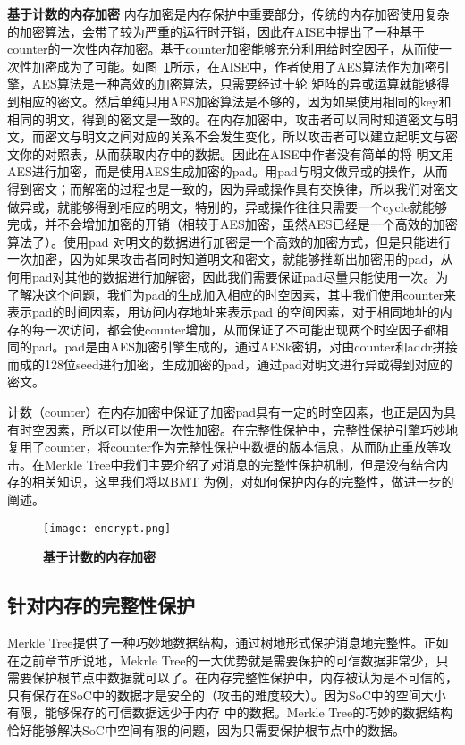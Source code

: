 \textbf{基于计数的内存加密}
内存加密是内存保护中重要部分，传统的内存加密使用复杂的加密算法，会带了较为严重的运行时开销，因此在AISE中提出了一种基于counter的一次性内存加密。基于counter加密能够充分利用给时空因子，从而使一次性加密成为了可能。如图~\ref{fig:encrypt.png}所示，在AISE中，作者使用了AES算法作为加密引擎，AES算法是一种高效的加密算法，只需要经过十轮
矩阵的异或运算就能够得到相应的密文。然后单纯只用AES加密算法是不够的，因为如果使用相同的key和相同的明文，得到的密文是一致的。在内存加密中，攻击者可以同时知道密文与明文，而密文与明文之间对应的关系不会发生变化，所以攻击者可以建立起明文与密文你的对照表，从而获取内存中的数据。因此在AISE中作者没有简单的将
明文用AES进行加密，而是使用AES生成加密的pad。用pad与明文做异或的操作，从而得到密文；而解密的过程也是一致的，因为异或操作具有交换律，所以我们对密文做异或，就能够得到相应的明文，特别的，异或操作往往只需要一个cycle就能够完成，并不会增加加密的开销（相较于AES加密，虽然AES已经是一个高效的加密算法了）。使用pad
对明文的数据进行加密是一个高效的加密方式，但是只能进行一次加密，因为如果攻击者同时知道明文和密文，就能够推断出加密用的pad，从何用pad对其他的数据进行加解密，因此我们需要保证pad尽量只能使用一次。为了解决这个问题，我们为pad的生成加入相应的时空因素，其中我们使用counter来表示pad的时间因素，用访问内存地址来表示pad
的空间因素，对于相同地址的内存的每一次访问，都会使counter增加，从而保证了不可能出现两个时空因子都相同的pad。pad是由AES加密引擎生成的，通过AESk密钥，对由counter和addr拼接而成的128位seed进行加密，生成加密的pad，通过pad对明文进行异或得到对应的密文。

计数（counter）在内存加密中保证了加密pad具有一定的时空因素，也正是因为具有时空因素，所以可以使用一次性加密。在完整性保护中，完整性保护引擎巧妙地复用了counter，将counter作为完整性保护中数据的版本信息，从而防止重放等攻击。在Merkle Tree中我们主要介绍了对消息的完整性保护机制，但是没有结合内存的相关知识，这里我们将以BMT
为例，对如何保护内存的完整性，做进一步的阐述。
\begin{figure}[!htp]
    \centering
    \texttt{[image: encrypt.png]}
    \caption{\textbf{基于计数的内存加密 }}
   \label{fig:encrypt.png}
\end{figure}

\subsection{针对内存的完整性保护}
Merkle Tree提供了一种巧妙地数据结构，通过树地形式保护消息地完整性。正如在之前章节所说地，Mekrle Tree的一大优势就是需要保护的可信数据非常少，只需要保护根节点中数据就可以了。在内存完整性保护中，内存被认为是不可信的，只有保存在SoC中的数据才是安全的（攻击的难度较大）。因为SoC中的空间大小有限，能够保存的可信数据远少于内存
中的数据。Merkle Tree的巧妙的数据结构恰好能够解决SoC中空间有限的问题，因为只需要保护根节点中的数据。

